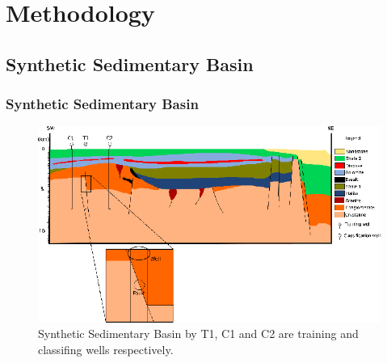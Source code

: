 \documentclass[aspectratio=10]{beamer} %
\begin{document}
\section{Methodology}

\subsection{Synthetic Sedimentary Basin}

\begin{frame}
	\frametitle{Synthetic Sedimentary Basin}
	\begin{figure}[H]
		\centering
		\includegraphics[scale=0.34]{Imagens/Basin.eps}
		\caption{\footnotesize Synthetic Sedimentary Basin by \cite{Sal2008}  T1, C1 and C2 are training and classifing wells respectively.}
		\label{Model}
	\end{figure}
\end{frame}
\end{document}
